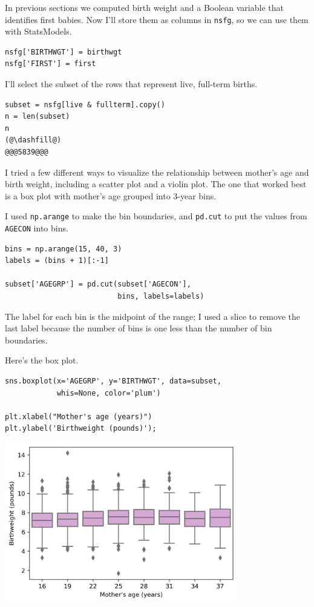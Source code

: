 In previous sections we computed birth weight and a Boolean variable
that identifies first babies. Now I'll store them as columns in
\passthrough{\lstinline!nsfg!}, so we can use them with StatsModels.

\begin{lstlisting}[]
nsfg['BIRTHWGT'] = birthwgt
nsfg['FIRST'] = first
\end{lstlisting}

I'll select the subset of the rows that represent live, full-term
births.

\begin{lstlisting}[]
subset = nsfg[live & fullterm].copy()
n = len(subset)
n
(@\dashfill@)
@@@5839@@@
\end{lstlisting}

I tried a few different ways to visualize the relationship between
mother's age and birth weight, including a scatter plot and a violin
plot. The one that worked best is a box plot with mother's age grouped
into 3-year bins.

I used \passthrough{\lstinline!np.arange!} to make the bin boundaries,
and \passthrough{\lstinline!pd.cut!} to put the values from
\passthrough{\lstinline!AGECON!} into bins.

\begin{lstlisting}[]
bins = np.arange(15, 40, 3)
labels = (bins + 1)[:-1]

subset['AGEGRP'] = pd.cut(subset['AGECON'], 
                          bins, labels=labels)
\end{lstlisting}

The label for each bin is the midpoint of the range; I used a slice to
remove the last label because the number of bins is one less than the
number of bin boundaries.

Here's the box plot.

\begin{lstlisting}[]
sns.boxplot(x='AGEGRP', y='BIRTHWGT', data=subset, 
            whis=None, color='plum')

plt.xlabel("Mother's age (years)")
plt.ylabel('Birthweight (pounds)');
\end{lstlisting}

\begin{center}
\includegraphics[width=4in]{13_hypothesis_files/13_hypothesis_118_0.png}
\end{center}

